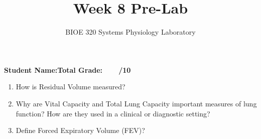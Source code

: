 \documentclass{article}
\title{Week 8 Pre-Lab}
\author{BIOE 320 Systems Physiology Laboratory}
\date{}
\begin{document}
\maketitle
\large

\textbf{Student Name:}\hfill 	\textbf{Total Grade:\ \ \ \ /10}\vspace{0.5cm}

\begin{enumerate}
	\item How is Residual Volume measured?
	\item Why are Vital Capacity and Total Lung Capacity important measures of lung function? How are they used in a clinical or diagnostic setting?
	\item Define Forced Expiratory Volume (FEV)?
\end{enumerate}
\end{document}

